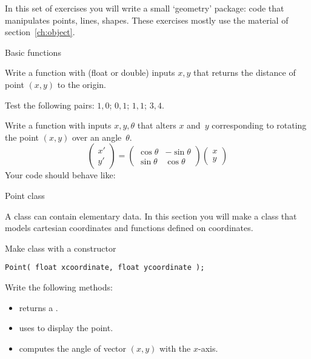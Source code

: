 
In this set of exercises you will write a small `geometry' package:
code that manipulates points, lines, shapes.
These exercises mostly use the material of section~\ref{ch:object}.

 {Basic functions}
\label{sec:geom-basic}

\begin{exercise}
  \label{ex:func-pointdistance}
  Write a function with (float or double) inputs $x,y$ that returns the distance of
  point $(x,y)$ to the origin.

  Test the following pairs: $1,0$; $0,1$; $1,1$; $3,4$.
\end{exercise}

\begin{exercise}
  \label{ex:pointrotate}
  Write a function with inputs $x,y,\theta$ that alters $x$ and~$y$
  corresponding to rotating the point $(x,y)$ over an angle~$\theta$.
  \[
  \begin{pmatrix}
    x'\\y'
  \end{pmatrix} =
  \begin{pmatrix}
    \cos\theta& -\sin\theta\\ \sin\theta&\cos\theta
  \end{pmatrix}
  \begin{pmatrix}
    x\\y
  \end{pmatrix}
  \]
  Your code should behave like:
\end{exercise}

 {Point class}
\label{ex:pointfunc}

\prerequisite{\ref{sec:object}}

A class can contain elementary data. In this section you will make a
 class that models cartesian coordinates and functions
defined on coordinates.

\begin{exercise}
  \label{ex:geom:point}
  Make class  with a constructor
\begin{lstlisting}
Point( float xcoordinate, float ycoordinate );
\end{lstlisting}
Write the following methods:
\begin{itemize}
\item {} returns a .
\item  {} uses  to display the point.
\item {} computes the angle of vector $(x,y)$ with the $x$-axis.
\end{itemize}
\end{exercise}

